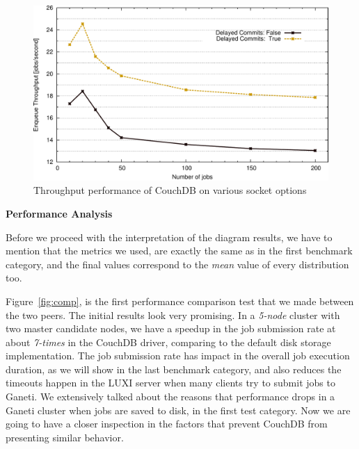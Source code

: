 \begin{figure}[htbp]
  \begin{center}
    \includegraphics[width=1.0\maxwidth]{../figures/couch_comp.pdf}
    \caption{Throughput performance of CouchDB on various socket options}
    \label{fig:couch_comp}
  \end{center}
\end{figure}

\textbf{Performance Analysis}

Before we proceed with the interpretation of the diagram results, we have to
mention that the metrics we used, are exactly the same as in the first benchmark
category, and the final values correspond to the \emph{mean} value of every
distribution too.

Figure~\ref{fig:comp}, is the first performance comparison test that we
made between the two peers. The initial results look very promising. In a
\emph{5-node} cluster with two master candidate nodes, we have a speedup in the
job submission rate at about \emph{7-times} in the CouchDB driver, comparing to
the default disk storage implementation. The job submission rate has impact in
the overall job execution duration, as we will show in the last benchmark
category, and also reduces the timeouts happen in the LUXI server when many
clients try to submit jobs to Ganeti. We extensively talked about the reasons
that performance drops in a Ganeti cluster when jobs are saved to disk, in the
first test category. Now we are going to have a closer inspection in the
factors that prevent CouchDB from presenting similar behavior.

